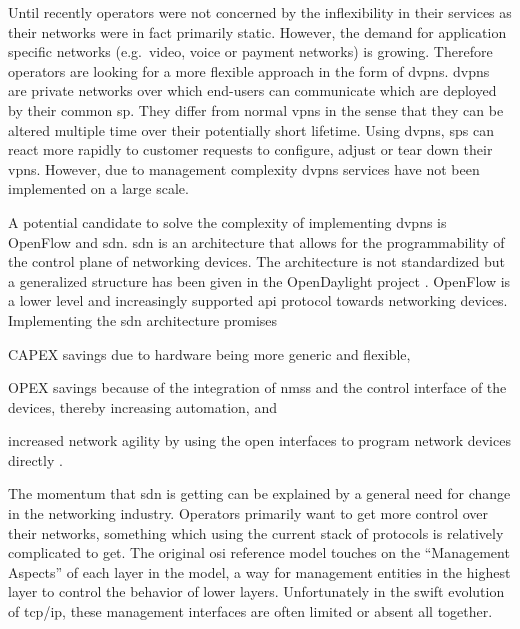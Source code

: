 Until recently operators were not concerned by the inflexibility in their services as their networks were in fact primarily static. However, the demand for application specific networks (e.g.\ video, voice or payment networks) is growing. Therefore operators are looking for a more flexible approach in the form of \acp{dvpn}. \acp{dvpn} are private networks over which end-users can communicate which are deployed by their common \ac{sp}. They differ from normal \acp{vpn} in the sense that they can be altered multiple time over their potentially short lifetime. Using \acp{dvpn}, \acp{sp} can react more rapidly to customer requests to configure, adjust or tear down their \acp{vpn}. However, due to management complexity \acp{dvpn} services have not been implemented on a large scale.

A potential candidate to solve the complexity of implementing \acp{dvpn} is OpenFlow \cite{openflow} and \ac{sdn}. \ac{sdn} is an architecture that allows for the programmability of the control plane of networking devices. The architecture is not standardized but a generalized structure has been given in the OpenDaylight project \cite{opendaylight}. OpenFlow is a lower level and increasingly supported \ac{api} protocol towards networking devices. Implementing the \ac{sdn} architecture promises
\begin{inparaenum}
	\item CAPEX savings due to hardware being more generic and flexible,
	\item OPEX savings because of the integration of \acp{nms} and the control interface of the devices, thereby increasing automation, and
	\item increased network agility by using the open interfaces to program network devices directly \cite{packet-circuit}.
	\end{inparaenum} 

	
The momentum that \ac{sdn} is getting can be explained by a general need for change in the networking industry. Operators primarily want to get more control over their networks, something which using the current stack of protocols is relatively complicated to get. The original \acs{osi} reference model \cite{zimmermann} touches on the ``Management Aspects'' of each layer in the model, a way for management entities in the highest layer to control the behavior of lower layers. Unfortunately in the swift evolution of \ac{tcp}/\ac{ip}, these management interfaces are often limited or absent all together. 



